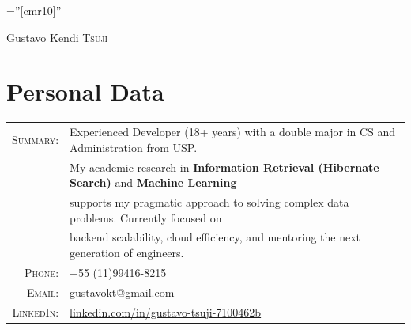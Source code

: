 \documentclass[a4paper,10pt]{article}
\begin{document}
\pagestyle{empty} %

\font\fb=''[cmr10]'' %

\par{\centering
		{\Huge Gustavo Kendi \textsc{Tsuji}
	}\bigskip\par}

\section{Personal Data}

\begin{tabular}{rl}
    \textsc{Summary:}   & Experienced Developer (18+ years) with a double major in CS and Administration from USP.\\
    & My academic research in \textbf{Information Retrieval (Hibernate Search)} and \textbf{Machine Learning} \\
    & supports my pragmatic approach to solving complex data problems. Currently focused on \\
    & backend scalability, cloud efficiency, and mentoring the next generation of engineers.\\
    \textsc{Phone:}      & +55 (11)99416-8215\\
    \textsc{Email:}      & \href{mailto:gustavokt@gmail.com}{gustavokt@gmail.com} \\
    \textsc{LinkedIn:}   & \href{linkedin.com/in/gustavo-tsuji-7100462b}{linkedin.com/in/gustavo-tsuji-7100462b}
\end{tabular}

\end{document}
